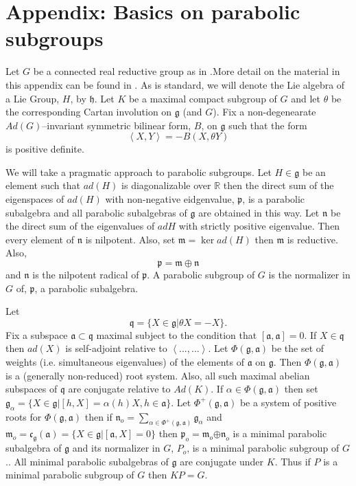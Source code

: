 \documentclass[12pt]{article}%
\begin{document}
\section{Appendix: Basics on parabolic subgroups}

Let $G$ be a connected real reductive group as in \cite{BoWa}.More detail on
the material in this appendix can be found in \cite{RRGI}. As is standard, we
will denote the Lie algebra of a Lie Group, $H$, by $\mathfrak{h}$. Let $K $
be a maximal compact subgroup of $G$ and let $\theta$ be the corresponding
Cartan involution on $\mathfrak{g}$ (and $G$). Fix a non-degenearate
$Ad(G)$--invariant symmetric bilinear form, $B$, on $\mathfrak{g}$ such that
the form
\[
\left\langle X,Y\right\rangle =-B(X,\theta Y)
\]
is positive definite.

We will take a pragmatic approach to parabolic subgroups. Let $H\in
\mathfrak{g}$ be an element such that $ad(H)$ is diagonalizable over
$\mathbb{R}$ then the direct sum of the eigenspaces of $ad(H)$ with
non-negative eidgenvalue, $\mathfrak{p}$, is a parabolic subalgebra and all
parabolic subalgebras of $\mathfrak{g}$ are obtained in this way. Let
$\mathfrak{n}$ be the direct sum of the eigenvalues of $adH$ with strictly
positive eigenvalue. Then every element of $\mathfrak{n}$ is nilpotent. Also,
set $\mathfrak{m}=\ker ad(H)$ then $\mathfrak{m}$ is reductive. Also,
\[
\mathfrak{p}=\mathfrak{m\oplus\mathfrak{n}}
\]
and $\mathfrak{n}$ is the nilpotent radical of $\mathfrak{p}$. A parabolic
subgroup of $G$ is the normalizer in $G$ of, $\mathfrak{p}$, a parabolic subalgebra.

Let
\[
\mathfrak{q}=\{X\in\mathfrak{g}|\theta X=-X\}.
\]
Fix a subspace $\mathfrak{a\subset q}$ maximal subject to the condition that
$[\mathfrak{a},\mathfrak{a}]=0$. If $X\in\mathfrak{q}$ then $ad(X)$ is
self-adjoint relative to $\left\langle ...,...\right\rangle $. Let
$\Phi(\mathfrak{g},\mathfrak{a})$ be the set of weights (i.e. simultaneous
eigenvalues) of the elements of $\mathfrak{a}$ on $\mathfrak{g}$. Then
$\Phi(\mathfrak{g},\mathfrak{a})$ is a (generally non-reduced) root system.
Also, all such maximal abelian subspaces of $\mathfrak{q}$ are conjugate
relative to $Ad(K)$. If $\alpha\in\Phi(\mathfrak{g},\mathfrak{a})$ then set
$\mathfrak{g}_{\alpha}=\{X\in\mathfrak{g}|[h,X]=\alpha(h)X,h\in\mathfrak{a\}}%
$. Let $\Phi^{+}(\mathfrak{g},\mathfrak{a})$ be a system of positive roots for
$\Phi(\mathfrak{g},\mathfrak{a})$ then if $\mathfrak{n}_{o}\mathfrak{=}%
\sum_{\alpha\in\Phi^{+}(\mathfrak{g},\mathfrak{a})}\mathfrak{g}_{\alpha}$ and
$\mathfrak{m}_{o}\mathfrak{=\mathfrak{c}}_{\mathfrak{g}}(\mathfrak{a}%
)=\{X\in\mathfrak{g}|[\mathfrak{a},X]=0\}$ then $\mathfrak{p}_{o}%
\mathfrak{=\mathfrak{m}}_{o}\mathfrak{\mathfrak{\oplus\mathfrak{n}}}_{o} $ is
a minimal parabolic subalgebra of $\mathfrak{g}$ and its normalizer in $G$,
$P_{o}$, is a minimal parabolic subgroup of $G$.. All minimal parabolic
subalgebras of $\mathfrak{g}$ are conjugate under $K$. Thus if $P$ is a
minimal parabolic subgroup of $G$ then $KP=G$.
\end{document}
